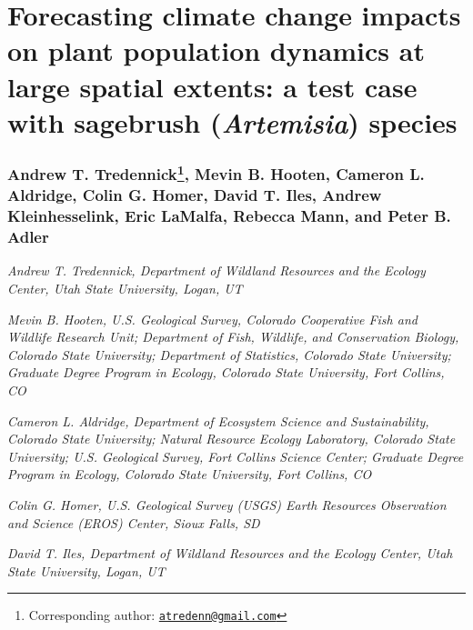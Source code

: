 \documentclass[12pt,]{article}
\title{}
\author{}
\date{}
\let\rmarkdownfootnote\footnote%
\def\footnote{\protect\rmarkdownfootnote}
\begin{document}
\maketitle


\section{Forecasting climate change impacts on plant population dynamics
at large spatial extents: a test case with sagebrush (\emph{Artemisia})
species}\label{forecasting-climate-change-impacts-on-plant-population-dynamics-at-large-spatial-extents-a-test-case-with-sagebrush-species}

\subsubsection[Andrew T. Tredennick, Mevin B. Hooten, Cameron L.
Aldridge, Colin G. Homer, David T. Iles, Andrew Kleinhesselink, Eric
LaMalfa, Rebecca Mann, and Peter B. Adler]{Andrew T.
Tredennick\footnote{Corresponding author:
  \href{mailto:atredenn@gmail.com}{\href{mailto:atredenn@gmail.com}{\nolinkurl{atredenn@gmail.com}}}},
Mevin B. Hooten, Cameron L. Aldridge, Colin G. Homer, David T. Iles,
Andrew Kleinhesselink, Eric LaMalfa, Rebecca Mann, and Peter B.
Adler}\label{andrew-t.-tredennickcorrauth-mevin-b.-hooten-cameron-l.-aldridge-colin-g.-homer-david-t.-iles-andrew-kleinhesselink-eric-lamalfa-rebecca-mann-and-peter-b.-adler}

\emph{Andrew T. Tredennick, Department of Wildland Resources and the
Ecology Center, Utah State University, Logan, UT}

\emph{Mevin B. Hooten, U.S. Geological Survey, Colorado Cooperative Fish
and Wildlife Research Unit; Department of Fish, Wildlife, and
Conservation Biology, Colorado State University; Department of
Statistics, Colorado State University; Graduate Degree Program in
Ecology, Colorado State University, Fort Collins, CO}

\emph{Cameron L. Aldridge, Department of Ecosystem Science and
Sustainability, Colorado State University; Natural Resource Ecology
Laboratory, Colorado State University; U.S. Geological Survey, Fort
Collins Science Center; Graduate Degree Program in Ecology, Colorado
State University, Fort Collins, CO}

\emph{Colin G. Homer, U.S. Geological Survey (USGS) Earth Resources
Observation and Science (EROS) Center, Sioux Falls, SD}

\emph{David T. Iles, Department of Wildland Resources and the Ecology
Center, Utah State University, Logan, UT}
\end{document}
